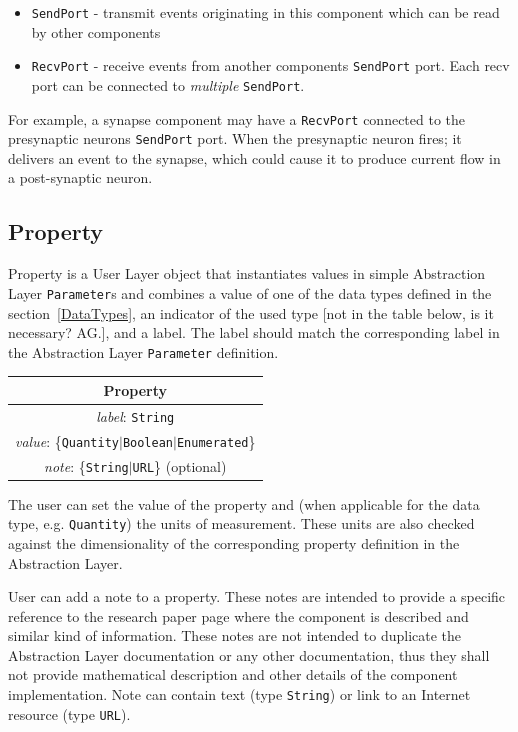 \documentclass{article}
\begin{document}
\begin{itemize}
\item {\tt SendPort} - transmit events originating in this component which can be read by
other components
\item {\tt RecvPort} - receive events from another components {\tt SendPort} port.
Each recv port can be connected to \emph{multiple} {\tt SendPort}.
\end{itemize}

For example, a synapse component may have a {\tt RecvPort} connected to the
presynaptic neurons {\tt SendPort} port. When the presynaptic neuron fires;
it delivers an event to the synapse, which could cause it to produce current
flow in a post-synaptic neuron.

\subsection{Property}

Property is a User Layer object that instantiates values in simple
Abstraction Layer {\tt Parameter}s and combines a value of one of the data
types defined in the section~\ref{DataTypes}, an indicator of the used type
[not in the table below, is it necessary? AG.],
and a label. The label should match the corresponding label in the
Abstraction Layer {\tt Parameter} definition.

\begin{table}[htb]
\center
\begin{tabular}{|c|}
\hline
\hline
Property \\
\hline
\hline
{\em label}: {\tt String} \\
\hline
{\em value}: \{{\tt Quantity}$|${\tt Boolean}$|${\tt Enumerated}\} \\
\hline
{\em note}: \{{\tt String}$|${\tt URL}\} (optional)\\
\hline
\end{tabular}
\end{table}

The user can set the value of the property and (when applicable for the data
type, e.g. {\tt Quantity}) the units of measurement. These units are also
checked against the dimensionality of the corresponding property definition
in the Abstraction Layer.

User can add a note to a property. These notes are
intended to provide a specific reference to the research paper page
where the component is described and similar kind of information. These
notes are not intended to duplicate the Abstraction Layer documentation
or any other documentation, thus they shall not provide mathematical
description and other details of the component implementation. Note can
contain text (type {\tt String}) or link to an Internet resource (type
{\tt URL}).
\end{document}
